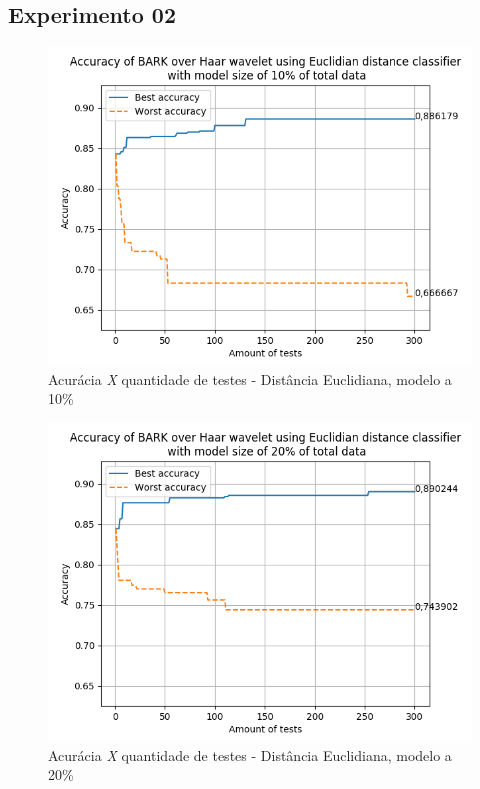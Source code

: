 \begin{myenv}{1.5}
		\section{Experimento 02}
		
		\begin{figure}[h]
			\centering
			\includegraphics{images/results/confusionMatrices/classifier_Euclidian_10}
			\caption{Acurácia \textit{X} quantidade de testes - Distância Euclidiana, modelo a 10\%}
			\label{fig:classifiereuclidian10}
		\end{figure}
		
		
		\newpage
		\begin{figure}[h]
			\centering
			\includegraphics{images/results/confusionMatrices/classifier_Euclidian_20}
			\caption{Acurácia \textit{X} quantidade de testes - Distância Euclidiana, modelo a 20\%}
			\label{fig:classifiereuclidian20}
		\end{figure}
		


\end{myenv}
